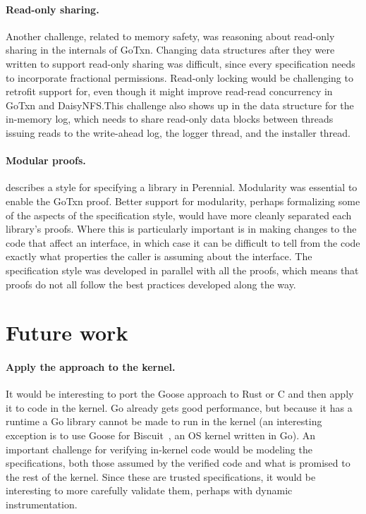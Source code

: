 \paragraph{Read-only sharing.}
Another challenge, related to memory safety, was reasoning about read-only
sharing in the internals of GoTxn. Changing data structures after they were written to support read-only
sharing was difficult, since every specification needs to incorporate fractional
permissions. Read-only locking would be challenging to retrofit support for, even
though it might improve read-read concurrency in GoTxn and DaisyNFS.\@ This challenge
also shows up in the data structure for the in-memory log, which needs to share
read-only data blocks between threads issuing reads to the write-ahead log, the logger
thread, and the installer thread.

\paragraph{Modular proofs.}
 describes a style for specifying a library in Perennial.
Modularity was essential to enable the GoTxn proof. Better support for
modularity, perhaps formalizing some of the aspects of the specification style,
would have more cleanly separated each library's proofs. Where this is
particularly important is in making changes to the code that affect an
interface, in which case it can be difficult to tell from the code exactly what
properties the caller is assuming about the interface. The specification style
was developed in parallel with all the proofs, which means that proofs do not
all follow the best practices developed along the way.

\section{Future work}

\paragraph{Apply the approach to the kernel.} It would be interesting to port
the Goose approach to Rust or C and then apply it to code in the kernel. Go
already gets good performance, but because it has a runtime a Go library cannot
be made to run in the kernel (an interesting exception is to use Goose for
Biscuit~\cite{cutler:biscuit}, an OS kernel written in Go). An important
challenge for verifying in-kernel code would be modeling the specifications,
both those assumed by the verified code and what is promised to the rest of the
kernel. Since these are trusted specifications, it would be interesting to more
carefully validate them, perhaps with dynamic instrumentation.

